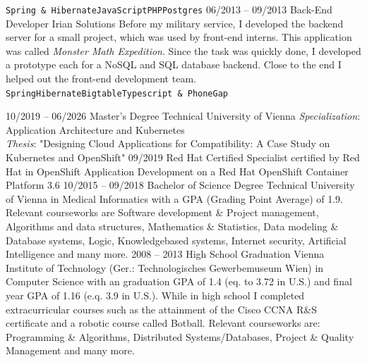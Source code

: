 \documentclass[9pt]{developercv} %
\begin{document}
\begin{entrylist}
{			\texttt{Spring \& Hibernate}\slashsep\texttt{JavaScript}\slashsep\texttt{PHP}\slashsep\texttt{Postgres}}
	\entry
		{06/2013 -- 09/2013}
		{Back-End Developer}
		{Irian Solutions}
		{Before my military service, I developed the backend server for a small project, which was used by front-end interns. This application was called \textit{Monster Math Expedition}. Since the task was quickly done, I developed a prototype each for a NoSQL and SQL database backend. Close to the end I helped out the front-end development team. \\ 
			\texttt{Spring}\slashsep\texttt{Hibernate}\slashsep\texttt{Bigtable}\slashsep\texttt{Typescript \& PhoneGap}}
\end{entrylist}



\begin{entrylist}
	\entry
		{10/2019 -- 06/2026}
		{Master's Degree}
		{Technical University of Vienna}
		{\textit{Specialization}: Application Architecture and Kubernetes \\ 
		\textit{Thesis}: "Designing Cloud Applications for Compatibility: A Case Study on Kubernetes and OpenShift"
		}
	\entry
		{09/2019}
		{Red Hat Certified Specialist}
		{certified by Red Hat}
		{in OpenShift Application Development on a Red Hat OpenShift Container Platform 3.6}
	\entry
		{10/2015 -- 09/2018}
		{Bachelor of Science Degree}
		{Technical University of Vienna}
		{in Medical Informatics with a GPA (Grading Point Average) of 1.9. Relevant courseworks are Software development \& Project management, Algorithms and data structures, Mathematics \& Statistics, Data modeling \& Database systems, Logic, Knowledgebased systems, Internet security, Artificial Intelligence and many more.}
	\entry
		{2008 -- 2013}
		{High School Graduation}
		{Vienna Institute of Technology (Ger.: Technologisches Gewerbemuseum Wien)}
		{in Computer Science with an graduation GPA of 1.4 (eq. to 3.72 in U.S.) and final year GPA of 1.16 (e.q. 3.9 in U.S.). While in high school I completed extracurricular courses such as the  attainment of the Cisco CCNA R\&S certificate and a robotic course called Botball.  Relevant courseworks are: Programming \& Algorithms, Distributed Systems/Databases, Project \& Quality Management and many more.}
\end{entrylist}
\end{document}
